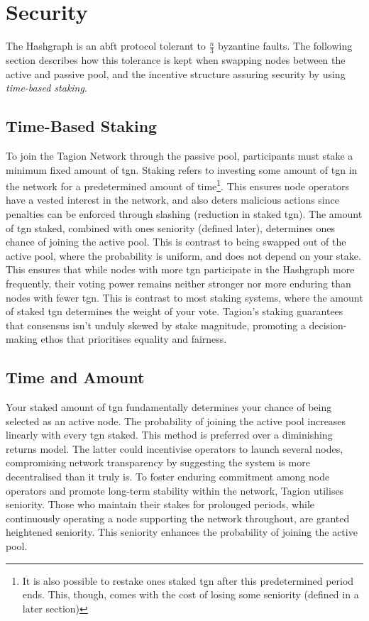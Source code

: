 \section{Security}\label{sec:security}
    The Hashgraph is an \gls{abft} protocol tolerant to $\frac{n}{3}$ byzantine faults. The following section describes how this tolerance is kept when swapping nodes between the active and passive pool, and the incentive structure assuring security by using \textit{time-based staking}.

\subsection{Time-Based Staking}
    To join the Tagion Network through the passive pool, participants must stake a minimum fixed amount of \acrfull{tgn}. Staking refers to investing some amount of \gls{tgn} in the network for a predetermined amount of time\footnote{It is also possible to restake ones staked \gls{tgn} after this predetermined period ends. This, though, comes with the cost of losing some seniority (defined in a later section)}. This ensures node operators have a vested interest in the network, and also deters malicious actions since penalties can be enforced through slashing (reduction in staked \gls{tgn}). 
    The amount of \gls{tgn} staked, combined with ones seniority (defined later), determines ones chance of joining the active pool. This is contrast to being swapped out of the active pool, where the probability is uniform, and does not depend on your stake. This ensures that while nodes with more \gls{tgn} participate in the Hashgraph more frequently, their voting power remains neither stronger nor more enduring than nodes with fewer \gls{tgn}. This is contrast to most staking systems, where the amount of staked \gls{tgn} determines the weight of your vote. Tagion's staking guarantees that consensus isn't unduly skewed by stake magnitude, promoting a decision-making ethos that prioritises equality and fairness.

\subsection{Time and Amount}
    Your staked amount of \gls{tgn} fundamentally determines your chance of being selected as an active node. The probability of joining the active pool increases linearly with every \gls{tgn} staked. This method is preferred over a diminishing returns model. The latter could incentivise operators to launch several nodes, compromising network transparency by suggesting the system is more decentralised than it truly is. To foster enduring commitment among node operators and promote long-term stability within the network, Tagion utilises seniority. Those who maintain their stakes for prolonged periods, while continuously operating a node supporting the network throughout, are granted heightened seniority. This seniority enhances the probability of joining the active pool.
    

